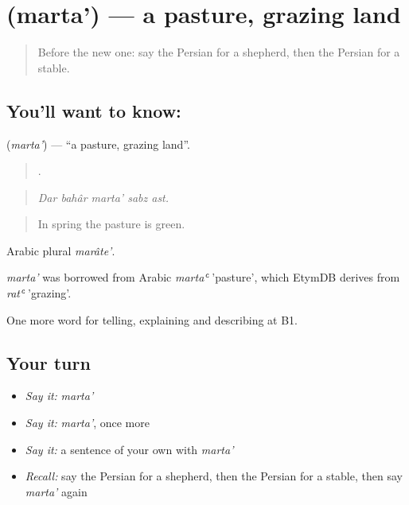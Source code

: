 \section[\texorpdfstring{\fa{مرتع} (marta')}{مرتع (marta')}]{ (marta') — a pasture, grazing land}

\label{lesson:FA-C466-marta}



\begin{quote}
Before the new one: say the Persian for a shepherd, then the Persian for a stable.
\end{quote}

\subsection*{You'll want to know: }
\textbf{} (\emph{marta'}) — \textquotedblleft{}a pasture, grazing land\textquotedblright{}.

\begin{quote}
    .
\end{quote}

\begin{quote}
\emph{Dar bahâr marta' sabz ast.}
\end{quote}

\begin{quote}
In spring the pasture is green.
\end{quote}

Arabic plural \emph{marâte'}.

\begin{cousinweb}
\emph{marta'} was borrowed from Arabic \emph{martaʿ} 'pasture', which EtymDB derives from \emph{ratʿ} 'grazing'.
\end{cousinweb}

\begin{grammarlens}[title={What you've built}]
One more word for telling, explaining and describing at B1.
\end{grammarlens}

\subsection*{Your turn}
\begin{itemize}
\raggedright
  \item \emph{Say it:} \emph{marta'}
  \item \emph{Say it:} \emph{marta'}, once more
  \item \emph{Say it:} a sentence of your own with \emph{marta'}
  \item \emph{Recall:} say the Persian for a shepherd, then the Persian for a stable, then say \emph{marta'} again
\end{itemize}

